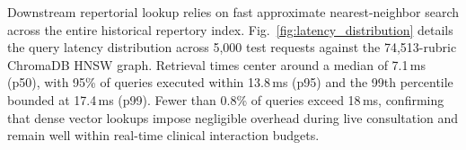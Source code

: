 Downstream repertorial lookup relies on fast approximate nearest-neighbor search across the entire historical repertory index. Fig.~\ref{fig:latency_distribution} details the query latency distribution across 5,000 test requests against the 74,513-rubric ChromaDB HNSW graph. Retrieval times center around a median of 7.1\,ms (p50), with 95\% of queries executed within 13.8\,ms (p95) and the 99th percentile bounded at 17.4\,ms (p99). Fewer than 0.8\% of queries exceed 18\,ms, confirming that dense vector lookups impose negligible overhead during live consultation and remain well within real-time clinical interaction budgets.
